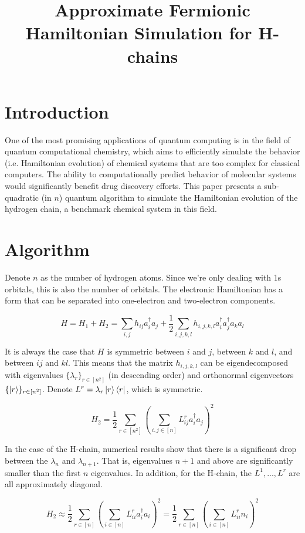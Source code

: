 \documentclass{article}
\begin{document}
\title{Approximate Fermionic Hamiltonian Simulation for H-chains}

\maketitle

\section{Introduction}

One of the most promising applications of quantum computing is in the field of quantum computational chemistry, which aims to efficiently simulate the behavior (i.e. Hamiltonian evolution) of chemical systems that are too complex for classical computers. The ability to computationally predict behavior of molecular systems would significantly benefit drug discovery efforts. This paper presents a sub-quadratic (in $n$) quantum algorithm to simulate the Hamiltonian evolution of the hydrogen chain, a benchmark chemical system in this field.

\section{Algorithm}

Denote $n$ as the number of hydrogen atoms. Since we're only dealing with 1s orbitals, this is also the number of orbitals. The electronic Hamiltonian has a form that can be separated into one-electron and two-electron components.

\begin{equation}
    H = H_1 + H_2 = \sum_{i, j} h_{ij}a_i^\dag a_j + \frac{1}{2}\sum_{i, j, k, l} h_{i, j, k, l} a_i^\dag a_j^\dag a_ka_l
\end{equation}

It is always the case that $H$ is symmetric between $i$ and $j$, between $k$ and $l$, and between $ij$ and $kl$. This means that the matrix $h_{i, j, k, l}$ can be eigendecomposed with eigenvalues $\{\lambda_r\}_{r \in [n^2]}$ (in descending order) and orthonormal eigenvectors $\{\ket{r}\}_{r \in [n^2]}$. Denote $L^r = \lambda_r \ket{r}\bra{r}$, which is symmetric.

\begin{equation}
    H_2 = \frac{1}{2}\sum_{r \in [n^2]} (\sum_{i, j \in [n]} L^r_{ij}a_i^\dag a_j)^2
\end{equation}

In the case of the H-chain, numerical results show that there is a significant drop between the $\lambda_n$ and $\lambda_{n + 1}$. That is, eigenvalues $n + 1$ and above are significantly smaller than the first $n$ eigenvalues. %
In addition, for the H-chain, the $L^1, ..., L^r$ are all approximately diagonal. %

\begin{equation}
    H_2 \approx \frac{1}{2}\sum_{r \in [n]} (\sum_{i \in [n]} L^r_{ii}a_i^\dag a_i)^2 = \frac{1}{2}\sum_{r \in [n]} (\sum_{i \in [n]} L^r_{ii}n_i)^2
\end{equation}
\end{document}

